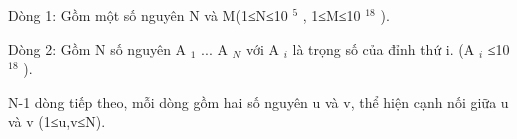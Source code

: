 Dòng 1: Gồm một số nguyên N và M(1≤N≤10   $^    5   $   , 1≤M≤10   $^    18   $   ).  

   Dòng 2: Gồm N số nguyên A   $_    1   $   ... A   $_    N   $   với A   $_    i   $   là trọng số của đỉnh thứ i. (A   $_    i   $   ≤10   $^    18   $   ).  

   N-1 dòng tiếp theo, mỗi dòng gồm hai số nguyên u và v, thể hiện cạnh nối giữa u và v (1≤u,v≤N).